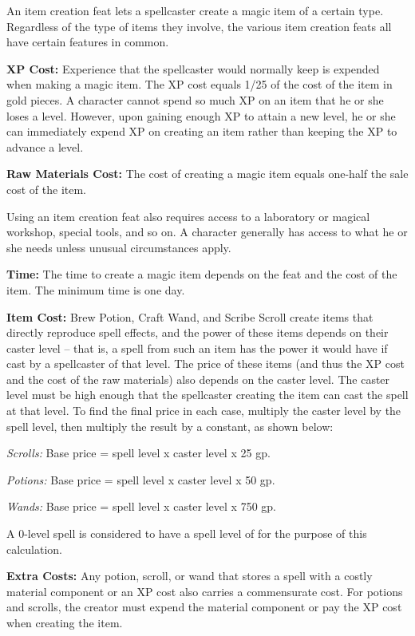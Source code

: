 An item creation feat lets a spellcaster create a magic item of a certain type. 
Regardless of the type of items they involve, the various item creation feats all 
have certain features in common.

\textbf{XP Cost:} Experience that the spellcaster would normally keep is expended 
when making a magic item. The XP cost equals 1/25 of the cost of the item in gold 
pieces. A character cannot spend so much XP on an item that he or she loses a level. 
However, upon gaining enough XP to attain a new level, he or she can immediately 
expend XP on creating an item rather than keeping the XP to advance a level.

\textbf{Raw Materials Cost:} The cost of creating a magic item equals one-half 
the sale cost of the item.

Using an item creation feat also requires access to a laboratory or magical workshop, 
special tools, and so on. A character generally has access to what he or she needs 
unless unusual circumstances apply.

\textbf{Time:} The time to create a magic item depends on the feat and the cost 
of the item. The minimum time is one day.

\textbf{Item Cost:} Brew Potion, Craft Wand, and Scribe Scroll create items that 
directly reproduce spell effects, and the power of these items depends on their 
caster level -- that is, a spell from such an item has the power it would have if 
cast by a spellcaster of that level. The price of these items (and thus the XP 
cost and the cost of the raw materials) also depends on the caster level. The caster 
level must be high enough that the spellcaster creating the item can cast the spell 
at that level. To find the final price in each case, multiply the caster level 
by the spell level, then multiply the result by a constant, as shown below:

\textit{Scrolls:} Base price = spell level x caster level x 25 gp.

\textit{Potions:} Base price = spell level x caster level x 50 gp.

\textit{Wands:} Base price = spell level x caster level x 750 gp.

A 0-level spell is considered to have a spell level of  for the purpose of this 
calculation.

\textbf{Extra Costs:} Any potion, scroll, or wand that stores a spell with a costly 
material component or an XP cost also carries a commensurate cost. For potions 
and scrolls, the creator must expend the material component or pay the XP cost 
when creating the item.

